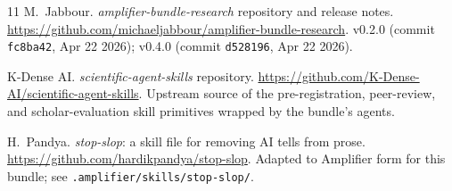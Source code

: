 \documentclass[11pt,letterpaper]{article}
\begin{document}
\begin{thebibliography}{11}
M.~Jabbour.
\newblock \emph{amplifier-bundle-research} repository and release
  notes.
\newblock \url{https://github.com/michaeljabbour/amplifier-bundle-research}.
\newblock v0.2.0 (commit \texttt{fc8ba42}, Apr 22 2026); v0.4.0
  (commit \texttt{d528196}, Apr 22 2026).

K-Dense AI.
\newblock \emph{scientific-agent-skills} repository.
\newblock \url{https://github.com/K-Dense-AI/scientific-agent-skills}.
\newblock Upstream source of the pre-registration, peer-review, and
  scholar-evaluation skill primitives wrapped by the bundle's agents.

H.~Pandya.
\newblock \emph{stop-slop}: a skill file for removing AI tells from
  prose.
\newblock \url{https://github.com/hardikpandya/stop-slop}.
\newblock Adapted to Amplifier form for this bundle; see
  \texttt{.amplifier/skills/stop-slop/}.

\end{thebibliography}
\end{document}
